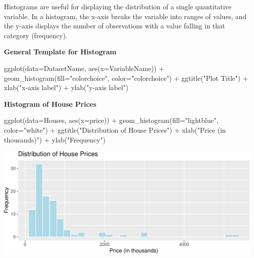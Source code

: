 \documentclass[
  letterpaper,
  DIV=11,
  numbers=noendperiod]{scrreprt}
\newenvironment{Shaded}{\begin{snugshade}}{\end{snugshade}}
\newcommand{\AttributeTok}[1]{\textcolor[rgb]{0.40,0.45,0.13}{#1}}
\newcommand{\FunctionTok}[1]{\textcolor[rgb]{0.28,0.35,0.67}{#1}}
\newcommand{\NormalTok}[1]{\textcolor[rgb]{0.00,0.23,0.31}{#1}}
\newcommand{\SpecialCharTok}[1]{\textcolor[rgb]{0.37,0.37,0.37}{#1}}
\newcommand{\StringTok}[1]{\textcolor[rgb]{0.13,0.47,0.30}{#1}}
\begin{document}
Histograms are useful for displaying the distribution of a single
quantitative variable. In a histogram, the x-axis breaks the variable
into ranges of values, and the y-axis displays the number of
observations with a value falling in that category (frequency).

\textbf{General Template for Histogram}

\begin{Shaded}
\begin{Highlighting}[]
\FunctionTok{ggplot}\NormalTok{(}\AttributeTok{data=}\NormalTok{DatasetName, }\FunctionTok{aes}\NormalTok{(}\AttributeTok{x=}\NormalTok{VariableName)) }\SpecialCharTok{+} 
  \FunctionTok{geom\_histogram}\NormalTok{(}\AttributeTok{fill=}\StringTok{"colorchoice"}\NormalTok{, }\AttributeTok{color=}\StringTok{"colorchoice"}\NormalTok{) }\SpecialCharTok{+} 
  \FunctionTok{ggtitle}\NormalTok{(}\StringTok{"Plot Title"}\NormalTok{) }\SpecialCharTok{+}
  \FunctionTok{xlab}\NormalTok{(}\StringTok{"x{-}axis label"}\NormalTok{) }\SpecialCharTok{+} 
  \FunctionTok{ylab}\NormalTok{(}\StringTok{"y{-}axis label"}\NormalTok{)}
\end{Highlighting}
\end{Shaded}

\textbf{Histogram of House Prices}

\begin{Shaded}
\begin{Highlighting}[]
\FunctionTok{ggplot}\NormalTok{(}\AttributeTok{data=}\NormalTok{Houses, }\FunctionTok{aes}\NormalTok{(}\AttributeTok{x=}\NormalTok{price)) }\SpecialCharTok{+} 
  \FunctionTok{geom\_histogram}\NormalTok{(}\AttributeTok{fill=}\StringTok{"lightblue"}\NormalTok{, }\AttributeTok{color=}\StringTok{"white"}\NormalTok{) }\SpecialCharTok{+} 
  \FunctionTok{ggtitle}\NormalTok{(}\StringTok{"Distribution of House Prices"}\NormalTok{) }\SpecialCharTok{+}
  \FunctionTok{xlab}\NormalTok{(}\StringTok{"Price (in thousands)"}\NormalTok{) }\SpecialCharTok{+} 
  \FunctionTok{ylab}\NormalTok{(}\StringTok{"Frequency"}\NormalTok{)}
\end{Highlighting}
\end{Shaded}

\includegraphics{Ch1_files/figure-pdf/unnamed-chunk-15-1.pdf}
\end{document}
